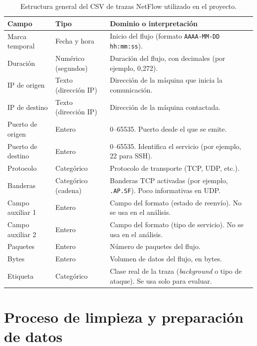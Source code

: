 \begin{table}[!htbp]
\centering
\small
\begin{tabular}{|l|l|p{6.4cm}|}
\hline
\textbf{Campo} & \textbf{Tipo} & \textbf{Dominio o interpretación} \\
\hline
Marca temporal & Fecha y hora & Inicio del flujo (formato \texttt{AAAA-MM-DD hh:mm:ss}). \\
\hline
Duración & Numérico (segundos) & Duración del flujo, con decimales (por ejemplo, 0,272). \\
\hline
IP de origen & Texto (dirección IP) & Dirección de la máquina que inicia la comunicación. \\
\hline
IP de destino & Texto (dirección IP) & Dirección de la máquina contactada. \\
\hline
Puerto de origen & Entero & 0--65535. Puerto desde el que se emite. \\
\hline
Puerto de destino & Entero & 0--65535. Identifica el servicio (por ejemplo, 22 para SSH). \\
\hline
Protocolo & Categórico & Protocolo de transporte (TCP, UDP, etc.). \\
\hline
Banderas & Categórico (cadena) & Banderas TCP activadas (por ejemplo, \texttt{.AP.SF}). Poco informativas en UDP. \\
\hline
Campo auxiliar 1 & Entero & Campo del formato (estado de reenvío). No se usa en el análisis. \\
\hline
Campo auxiliar 2 & Entero & Campo del formato (tipo de servicio). No se usa en el análisis. \\
\hline
Paquetes & Entero & Número de paquetes del flujo. \\
\hline
Bytes & Entero & Volumen de datos del flujo, en bytes. \\
\hline
Etiqueta & Categórico & Clase real de la traza (\emph{background} o tipo de ataque). Se usa solo para evaluar. \\
\hline
\end{tabular}
\caption{Estructura general del CSV de trazas NetFlow utilizado en el proyecto.}
\label{tab:csv_netflow_estructura}
\end{table}

\clearpage

\section{Proceso de limpieza y preparación de datos}
\label{sec:herr_preprocesado}

